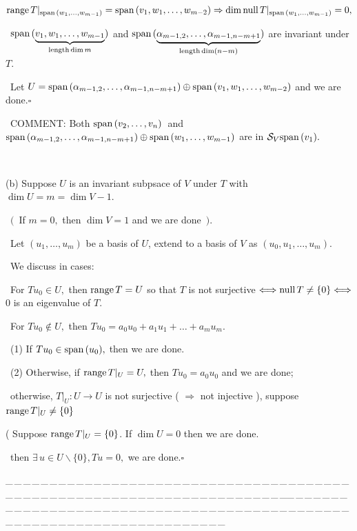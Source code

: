 \documentclass[a4paper, 11pt, UTF8]{article}
\def\range{\textup{range}\,}
\def\null{\textup{null\,}}
\def\Spn{\textup{span}\,}
\begin{document}
\begin{large}
$\range T|_{\Spn(w_1,\dots,w_{m-1})}=\Spn(v_1,w_1,\dots,w_{m-2})\Rightarrow\dim\null T|_{\Spn(w_1,\dots,w_{m-1})}=0,$\par\qquad\,
$\Spn(\underbrace{v_1,w_1,\dots,w_{m-1}}_{\textup{length} \dim m})$ and $\Spn(\underbrace{\alpha_{m-1,2},\dots,\alpha_{m-1,n-m+1}}_{\textup{length} \dim (n-m)})$ are invariant under $T.$\par\qquad\,
Let $U=\Spn(\alpha_{m-1,2},\dots,\alpha_{m-1,n-m+1})\oplus\Spn(v_1,w_1,\dots,w_{m-2})$ and we are done.\quad$\square$\par\qquad\,
C{\small OMMENT:} Both $\Spn(v_2,\dots,v_n)$ \,{\small and}\, $\Spn(\alpha_{m-1,2},\dots,\alpha_{m-1,n-m+1})\oplus\Spn(w_1,\dots,w_{m-1})$ are in $\mathcal{S}_V \Spn(v_1).$\par{\tiny\,\par}\quad
(b) Suppose $U$ is an invariant subpsace of $V$ under $T$ with $\dim U=m=\dim V-1.$\par\qquad\,
$(\,$ If $m=0,$ then $\dim V=1$ and we are done $\,).$\par\qquad\,
Let $(u_1,\dots,u_m)$ be a basis of $U$, extend to a basis of $V$ as $(u_0,u_1,\dots,u_m).$\par\qquad\,
We discuss in cases:\par\qquad\,
For $Tu_0\in U,$ then $\range T=U$ so that $T$ is not surjective $\Longleftrightarrow \null T\neq\{0\}\Longleftrightarrow$ $0$ is an eigenvalue of $T.$\par\qquad\,
For $Tu_0\not\in U,$ then $Tu_0=a_0 u_0+a_1 u_1+\dots+a_{m}u_{m}.$\par\qquad\,
(1) If $Tu_0\in\Spn(u_0),$ then we are done.\par\qquad\,
(2) Otherwise, if $\range T|_U=U,$ then $Tu_0=a_0 u_0$ and we are done;\par\qquad\qquad\qquad\qquad\,
otherwise, $T|_U:U\rightarrow U$ is not surjective ( $\Rightarrow$ not injective ), suppose $\range T|_U\neq\{0\}$\par\qquad\qquad\qquad\qquad\quad
( Suppose $\range T|_U=\{0\}$. If $\dim U=0$ then we are done.\par
{}\par\qquad\qquad\qquad\qquad\,
then $\exists\,u\in U\backslash\{0\},Tu=0,$ we are done.\quad$\square$
\par
{\tiny \_\,\_\,\_\,\_\,\_\,\_\,\_\,\_\,\_\,\_\,\_\,\_\,\_\,\_\,\_\,\_\,\_\,\_\,\_\,\_\,\_\,\_\,\_\,\_\,\_\,\_\,\_\,\_\,\_\,\_\,\_\,\_\,\_\,\_\,\_\,\_\,\_\,\_\,\_\,\_\,\_\,\_\,\_\,\_\,\_\,\_\,\_\,\_\,\_\,\_\,\_\,\_\,\_\,\_\,\_\,\_\,\_\,\_\,\_\,\_\,\_\,\_\,\_\,\_\,\_\,\_\,\_\,\_\,\_\,\_\,\_\_\,\_\,\_\,\_\,\_\,\_\,\_\,\_\,\_\,\_\,\_\,\_\,\_\,\_\,\_\,\_\,\_\,\_\,\_\,\_\,\_\,\_\,\_\,\_\,\_\,\_\,\_\,\_\,\_\,\_\,\_\,\_\,\_\,\_\,\_\,\_\,\_\,\_\,\_\,\_\,\_\,\_\,\_\,\_\,\_\,\_\,\_\,\_\,\_\,\_\,\_\,\_\,\_\,\_\,\_\,\_\,\_\,\_\,\_\,\_\,\_\,\_\,\_\,\_\,\_\,\_\,\_\,\_\,\_\,\_\,\_}\par


\end{large}
\end{document}
